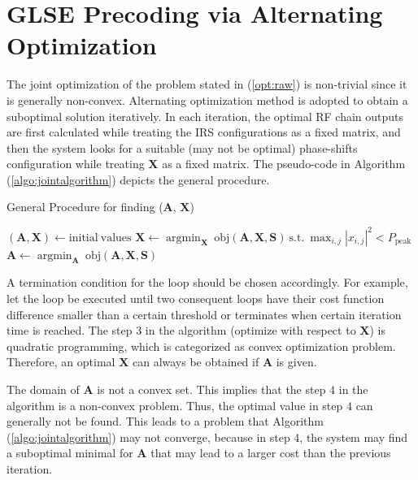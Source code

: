 \documentclass[12pt,draftclsnofoot,onecolumn,journal]{IEEEtran}
\begin{document}
\section{GLSE Precoding via Alternating Optimization}
The joint optimization of the problem stated in (\ref{opt:raw}) is non-trivial since it is generally non-convex. Alternating optimization method is adopted to obtain a suboptimal solution iteratively. In each iteration, the optimal RF chain outputs are first calculated while treating the IRS configurations as a fixed matrix, and then the system looks for a suitable (may not be optimal) phase-shifts configuration while treating $\mathbf X$ as a fixed matrix. The pseudo-code in Algorithm (\ref{algo:jointalgorithm}) depicts the general procedure. 
\begin{algorithm}
\caption{General Procedure for finding ($\mathbf{A}$, $\mathbf{X}$)}
\begin{algorithmic}[1]
\State $ (\mathbf{A}, \mathbf{X}) \gets \mathrm{initial\ values} $
\State $\mathbf{X}\gets \mathop{\arg\min}_{\mathbf{X}}\ \mathrm{obj}(\mathbf A, \mathbf X, \mathbf S)\ \mathrm{s.t.}\ \max_{i,j} |x_{i,j}|^2<P_{\mathrm{peak}} $ 
\State $\mathbf{A}\gets \mathop{\arg\min}_{\mathbf{A}}\ \mathrm{obj}(\mathbf A, \mathbf X, \mathbf S)$
\EndWhile
\end{algorithmic}
\label{algo:jointalgorithm}
\end{algorithm}

A termination condition for the loop should be chosen accordingly. For example, let the loop be executed until two consequent loops have their cost function difference smaller than a certain threshold or terminates when certain iteration time is reached. The step 3 in the algorithm (optimize with respect to $\mathbf X$) is quadratic programming, which is categorized as convex optimization problem. Therefore, an optimal $\mathbf X$ can always be obtained if $\mathbf A$ is given. 

The domain of $\mathbf A$ is not a convex set. This implies that the step 4 in the algorithm is a non-convex problem. Thus, the optimal value in step 4 can generally not be found. This leads to a problem that Algorithm (\ref{algo:jointalgorithm}) may not converge, because in step 4, the system may find a suboptimal minimal for $\mathbf A$ that may lead to a larger cost than the previous iteration. 
\end{document}
